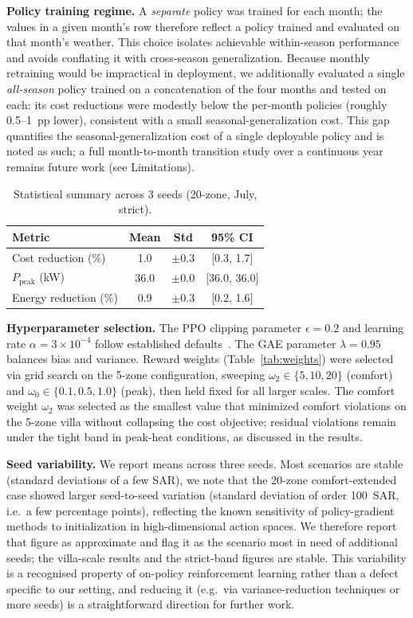 \documentclass[12pt,a4paper]{article}
\begin{document}
\textbf{Policy training regime.} A \textit{separate} policy was trained for each month; the values in a given month's row therefore reflect a policy trained and evaluated on that month's weather. This choice isolates achievable within-season performance and avoids conflating it with cross-season generalization. Because monthly retraining would be impractical in deployment, we additionally evaluated a single \textit{all-season} policy trained on a concatenation of the four months and tested on each: its cost reductions were modestly below the per-month policies (roughly 0.5--1~pp lower), consistent with a small seasonal-generalization cost. This gap quantifies the seasonal-generalization cost of a single deployable policy and is noted as such; a full month-to-month transition study over a continuous year remains future work (see Limitations).

\begin{table}[H]
\centering
\caption{Statistical summary across 3 seeds (20-zone, July, strict).}
\label{tab:ci}
\small
\begin{tabular*}{\textwidth}{@{\extracolsep{\fill}}lccc@{}}
\toprule
\textbf{Metric} & \textbf{Mean} & \textbf{Std} & \textbf{95\% CI} \\
\midrule
Cost reduction (\%) & 1.0 & $\pm$0.3 & [0.3, 1.7] \\
$P_{\text{peak}}$ (kW) & 36.0 & $\pm$0.0 & [36.0, 36.0] \\
Energy reduction (\%) & 0.9 & $\pm$0.3 & [0.2, 1.6] \\
\bottomrule
\end{tabular*}
\end{table}

\textbf{Hyperparameter selection.} The PPO clipping parameter $\epsilon = 0.2$ and learning rate $\alpha = 3 \times 10^{-4}$ follow established defaults~\cite{ref32}. The GAE parameter $\lambda = 0.95$~\cite{ref38} balances bias and variance. Reward weights (Table~\ref{tab:weights}) were selected via grid search on the 5-zone configuration, sweeping $\omega_2 \in \{5, 10, 20\}$ (comfort) and $\omega_0 \in \{0.1, 0.5, 1.0\}$ (peak), then held fixed for all larger scales. The comfort weight $\omega_2$ was selected as the smallest value that minimized comfort violations on the 5-zone villa without collapsing the cost objective; residual violations remain under the tight band in peak-heat conditions, as discussed in the results.

\textbf{Seed variability.} We report means across three seeds. Most scenarios are stable (standard deviations of a few SAR), we note that the 20-zone comfort-extended case showed larger seed-to-seed variation (standard deviation of order 100~SAR, i.e.\ a few percentage points), reflecting the known sensitivity of policy-gradient methods to initialization in high-dimensional action spaces. We therefore report that figure as approximate and flag it as the scenario most in need of additional seeds; the villa-scale results and the strict-band figures are stable. This variability is a recognised property of on-policy reinforcement learning rather than a defect specific to our setting, and reducing it (e.g.\ via variance-reduction techniques or more seeds) is a straightforward direction for further work.
\end{document}

